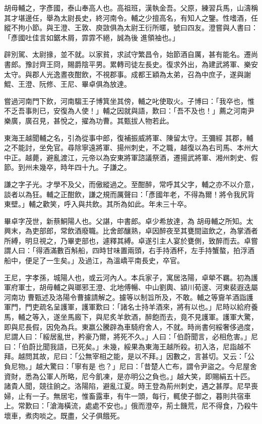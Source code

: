 \begin{pinyinscope}
 胡毋輔之，字彥國，泰山奉高人也。高祖班，漢執金吾。父原，練習兵馬，山濤稱其才堪邊任，舉為太尉長史，終河南令。輔之少擅高名，有知人之鑒。性嗜酒，任縱不拘小節。與王澄、王敦、庾敳俱為太尉王衍所暱，號曰四友。澄嘗與人書曰：「彥國吐佳言如鋸木屑，霏霏不絕，誠為後
 進領袖也。」



 辟別駕、太尉掾，並不就。以家貧，求試守繁昌令，始節酒自厲，甚有能名。遷尚書郎。豫討齊王冏，賜爵陰平男。累轉司徒左長史。復求外出，為建武將軍、樂安太守。與郡人光逸晝夜酣飲，不視郡事。成都王穎為太弟，召為中庶子，遂與謝鯤、王澄、阮修、王尼、畢卓俱為放達。



 嘗過河南門下飲，河南騶王子博箕坐其傍，輔之叱使取火。子博曰：「我卒也，惟不乏吾事則已，安復為人使！」輔之因就與語，歎曰：「吾不及也！」薦之河南尹樂廣，廣召見，甚悅之，擢為功曹。其甄拔人物若此。



 東海王越聞輔之名，引為從事中郎，復補振威將軍、陳留太守。王彌經
 其郡，輔之不能討，坐免官。尋除寧遠將軍、揚州刺史，不之職，越復以為右司馬、本州大中正。越薨，避亂渡江，元帝以為安東將軍諮議祭酒，遷揚武將軍、湘州刺史、假節。到州未幾卒，時年四十九。子謙之。



 謙之字子光。才學不及父，而傲縱過之。至酣醉，常呼其父字，輔之亦不以介意，談者以為狂。輔之正酣飲，謙之規而厲聲曰：「彥國年老，不得為爾！將令我尻背東壁。」輔之歡笑，呼入與共飲。其所為如此。年未三十卒。



 畢卓字茂世，新蔡鮦陽人也。父諶，中書郎。卓少希放達，為
 胡毋輔之所知。太興末，為吏部郎，常飲酒廢職。比舍郎釀熟，卓因醉夜至其甕間盜飲之，為掌酒者所縛，明旦視之，乃畢吏部也，遽釋其縛。卓遂引主人宴於甕側，致醉而去。卓嘗謂人曰：「得酒滿數百斛船，四時甘味置兩頭，右手持酒杯，左手持蟹螯，拍浮酒船中，便足了一生矣。」及過江，為溫嶠平南長史，卒官。



 王尼，字孝孫，城陽人也，或云河內人。本兵家子，寓居洛陽，卓犖不羈。初為護軍府軍士，胡毋輔之與瑯邪王澄、北地傅暢、中山劉輿、潁川荀邃、河東裴遐迭屬河南功
 曹甄述及洛陽令曹攄請解之。攄等以制旨所及，不敢。輔之等齎羊酒詣護軍門，門吏疏名呈護軍，護軍歎曰：「諸名士持羊酒來，將有以也。」尼時以給府養馬，輔之等入，遂坐馬廄下，與尼炙羊飲酒，醉飽而去，竟不見護軍。護軍大驚，即與尼長假，因免為兵。東嬴公騰辟為車騎府舍人，不就。時尚書何綏奢侈過度，尼謂人曰：「綏居亂世，矜豪乃爾，將死不久。」人曰：「伯蔚聞言，必相危害。」尼曰：「伯蔚比聞我語，已死矣。」未幾，綏果為東海王越所殺。初入洛，尼詣越不拜。越問其故，尼曰：「公無宰相之能，是以不拜。」因數之，言甚切。又云：「公負尼物。」越大驚曰：「寧有是
 也？」尼曰：「昔楚人亡布，謂令尹盜之。今尼屋舍資財，悉為公軍人所略，尼今飢凍，是亦明公之負也。」越大笑，即賜絹五十匹。諸貴人聞，競往餉之。洛陽陷，避亂江夏。時王登為荊州刺史，遇之甚厚。尼早喪婦，止有一子。無居宅，惟畜露車，有牛一頭，每行，輒使子御之，暮則共宿車上。常歎曰：「滄海橫流，處處不安也。」俄而澄卒，荊土饑荒，尼不得食，乃殺牛壞車，煮肉啖之。既盡，父子俱餓死。




\end{pinyinscope}
